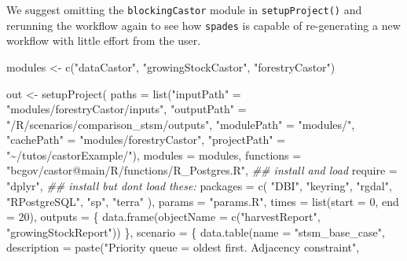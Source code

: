 \documentclass[
  letterpaper,
  DIV=11,
  numbers=noendperiod]{scrreprt}
\newenvironment{Shaded}{\begin{snugshade}}{\end{snugshade}}
\newcommand{\AttributeTok}[1]{\textcolor[rgb]{0.40,0.45,0.13}{#1}}
\newcommand{\DecValTok}[1]{\textcolor[rgb]{0.68,0.00,0.00}{#1}}
\newcommand{\DocumentationTok}[1]{\textcolor[rgb]{0.37,0.37,0.37}{\textit{#1}}}
\newcommand{\FunctionTok}[1]{\textcolor[rgb]{0.28,0.35,0.67}{#1}}
\newcommand{\NormalTok}[1]{\textcolor[rgb]{0.00,0.23,0.31}{#1}}
\newcommand{\OtherTok}[1]{\textcolor[rgb]{0.00,0.23,0.31}{#1}}
\newcommand{\StringTok}[1]{\textcolor[rgb]{0.13,0.47,0.30}{#1}}
\begin{document}
We suggest omitting the \texttt{blockingCastor} module in
\texttt{setupProject()} and rerunning the workflow again to see how
\texttt{spades} is capable of re-generating a new workflow with little
effort from the user.

\begin{Shaded}
\begin{Highlighting}[]
\NormalTok{modules }\OtherTok{\textless{}{-}} \FunctionTok{c}\NormalTok{(}\StringTok{"dataCastor"}\NormalTok{, }
             \StringTok{"growingStockCastor"}\NormalTok{, }
             \StringTok{"forestryCastor"}\NormalTok{)}

\NormalTok{out }\OtherTok{\textless{}{-}} \FunctionTok{setupProject}\NormalTok{(}
  \AttributeTok{paths =} \FunctionTok{list}\NormalTok{(}\StringTok{"inputPath"} \OtherTok{=} \StringTok{"modules/forestryCastor/inputs"}\NormalTok{,}
               \StringTok{"outputPath"} \OtherTok{=} \StringTok{"/R/scenarios/comparison\_stsm/outputs"}\NormalTok{,}
               \StringTok{"modulePath"} \OtherTok{=} \StringTok{"modules/"}\NormalTok{,}
               \StringTok{"cachePath"} \OtherTok{=} \StringTok{"modules/forestryCastor"}\NormalTok{,}
               \StringTok{"projectPath"} \OtherTok{=} \StringTok{"\textasciitilde{}/tutos/castorExample/"}\NormalTok{),}
  \AttributeTok{modules =}\NormalTok{ modules,}
  \AttributeTok{functions =} \StringTok{"bcgov/castor@main/R/functions/R\_Postgres.R"}\NormalTok{,}
  \DocumentationTok{\#\# install and load}
  \AttributeTok{require =} \StringTok{"dplyr"}\NormalTok{,}
  \DocumentationTok{\#\# install but don\textquotesingle{}t load these:}
  \AttributeTok{packages =} \FunctionTok{c}\NormalTok{(}
    \StringTok{"DBI"}\NormalTok{, }
    \StringTok{"keyring"}\NormalTok{,}
    \StringTok{"rgdal"}\NormalTok{, }
    \StringTok{"RPostgreSQL"}\NormalTok{, }
    \StringTok{"sp"}\NormalTok{,}
    \StringTok{"terra"}
\NormalTok{  ),}
  \AttributeTok{params =} \StringTok{"params.R"}\NormalTok{,}
  \AttributeTok{times =} \FunctionTok{list}\NormalTok{(}\AttributeTok{start =} \DecValTok{0}\NormalTok{, }\AttributeTok{end =} \DecValTok{20}\NormalTok{),}
  \AttributeTok{outputs =}\NormalTok{ \{}
    \FunctionTok{data.frame}\NormalTok{(}\AttributeTok{objectName =} \FunctionTok{c}\NormalTok{(}\StringTok{"harvestReport"}\NormalTok{,}
                              \StringTok{"growingStockReport"}\NormalTok{))}
\NormalTok{  \},}
  \AttributeTok{scenario =}\NormalTok{ \{}
    \FunctionTok{data.table}\NormalTok{(}\AttributeTok{name =} \StringTok{"stsm\_base\_case"}\NormalTok{,}
               \AttributeTok{description =} \FunctionTok{paste}\NormalTok{(}\StringTok{"Priority queue = oldest first. Adjacency constraint"}\NormalTok{,}

\end{Highlighting}
\end{Shaded}
\end{document}
